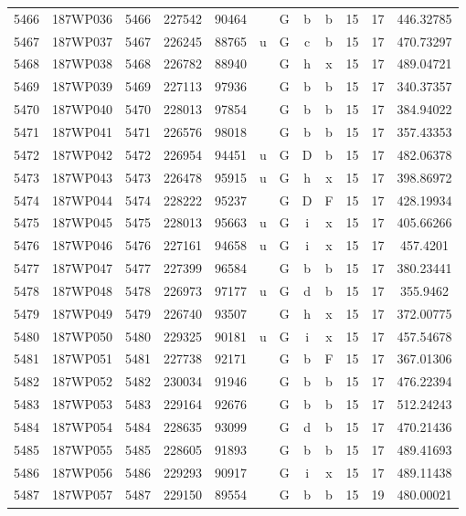 \begin{tabular}{|*{12}{c|}}
5466 & 187WP036 & 5466 & 227542 & 90464 &  & G & b & b & 15 & 17 & 446.32785 \\ 
5467 & 187WP037 & 5467 & 226245 & 88765 & u & G & c & b & 15 & 17 & 470.73297 \\ 
5468 & 187WP038 & 5468 & 226782 & 88940 &  & G & h & x & 15 & 17 & 489.04721 \\ 
5469 & 187WP039 & 5469 & 227113 & 97936 &  & G & b & b & 15 & 17 & 340.37357 \\ 
5470 & 187WP040 & 5470 & 228013 & 97854 &  & G & b & b & 15 & 17 & 384.94022 \\ 
5471 & 187WP041 & 5471 & 226576 & 98018 &  & G & b & b & 15 & 17 & 357.43353 \\ 
5472 & 187WP042 & 5472 & 226954 & 94451 & u & G & D & b & 15 & 17 & 482.06378 \\ 
5473 & 187WP043 & 5473 & 226478 & 95915 & u & G & h & x & 15 & 17 & 398.86972 \\ 
5474 & 187WP044 & 5474 & 228222 & 95237 &  & G & D & F & 15 & 17 & 428.19934 \\ 
5475 & 187WP045 & 5475 & 228013 & 95663 & u & G & i & x & 15 & 17 & 405.66266 \\ 
5476 & 187WP046 & 5476 & 227161 & 94658 & u & G & i & x & 15 & 17 & 457.4201 \\ 
5477 & 187WP047 & 5477 & 227399 & 96584 &  & G & b & b & 15 & 17 & 380.23441 \\ 
5478 & 187WP048 & 5478 & 226973 & 97177 & u & G & d & b & 15 & 17 & 355.9462 \\ 
5479 & 187WP049 & 5479 & 226740 & 93507 &  & G & h & x & 15 & 17 & 372.00775 \\ 
5480 & 187WP050 & 5480 & 229325 & 90181 & u & G & i & x & 15 & 17 & 457.54678 \\ 
5481 & 187WP051 & 5481 & 227738 & 92171 &  & G & b & F & 15 & 17 & 367.01306 \\ 
5482 & 187WP052 & 5482 & 230034 & 91946 &  & G & b & b & 15 & 17 & 476.22394 \\ 
5483 & 187WP053 & 5483 & 229164 & 92676 &  & G & b & b & 15 & 17 & 512.24243 \\ 
5484 & 187WP054 & 5484 & 228635 & 93099 &  & G & d & b & 15 & 17 & 470.21436 \\ 
5485 & 187WP055 & 5485 & 228605 & 91893 &  & G & b & b & 15 & 17 & 489.41693 \\ 
5486 & 187WP056 & 5486 & 229293 & 90917 &  & G & i & x & 15 & 17 & 489.11438 \\ 
5487 & 187WP057 & 5487 & 229150 & 89554 &  & G & b & b & 15 & 19 & 480.00021 \\ 

\end{tabular}
